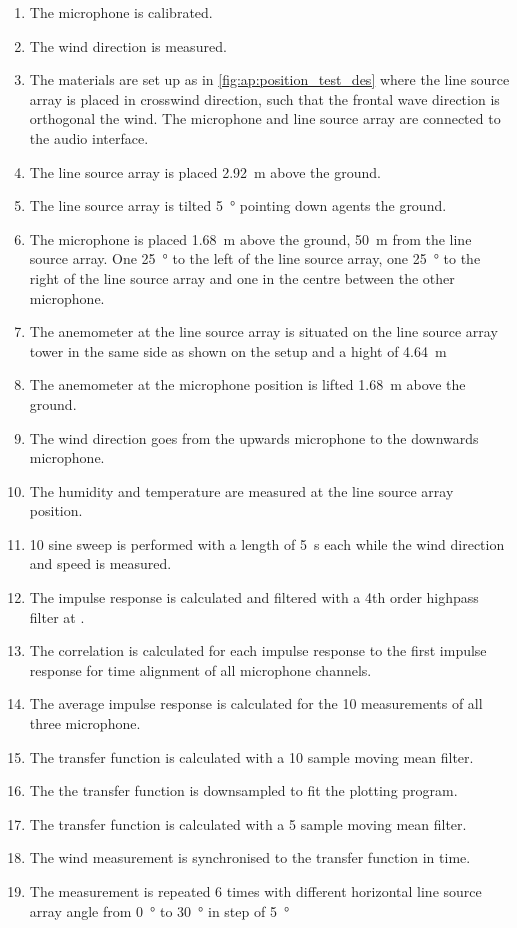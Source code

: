 \begin{enumerate}
\item The microphone is calibrated.
\item The wind direction is measured.
\item The materials are set up as in \autoref{fig:ap:position_test_des} where the line source array is placed in crosswind direction, such that the frontal wave direction is orthogonal the wind. The microphone and line source array are connected to the audio interface.
\item The line source array is placed \SI{2.92}{\meter} above the ground.
\item The line source array is tilted \SI{5}{\degree} pointing down agents the ground.
\item The microphone is placed \SI{1.68}{\meter} above the ground, \SI{50}{\meter} from the line source array. One \SI{25}{\degree} to the left of the line source array, one \SI{25}{\degree} to the right of the line source array and one in the centre between the other microphone.
\item The anemometer at the line source array is situated on the line source array tower in the same side as shown on the setup and a hight of \SI{4.64}{\meter}
\item The anemometer at the microphone position is lifted \SI{1.68}{\meter} above the ground.
\item The wind direction goes from the upwards microphone to the downwards microphone.
\item The humidity and temperature are measured at the line source array position.
\item 10 sine sweep is performed with a length of \SI{5}{\second} each while the wind direction and speed is measured.
\item The impulse response is calculated and filtered with a 4th order highpass filter at .
\item The correlation is calculated for each impulse response to the first impulse response for time alignment \citep{gunness2001loudspeaker} of all microphone channels.
\item The average impulse response is calculated for the 10 measurements of all three microphone.
\item The transfer function is calculated with a 10 sample moving mean filter.
\item The the transfer function is downsampled to fit the plotting program.
\item The transfer function is calculated with a 5 sample moving mean filter.
\item The wind measurement is synchronised to the transfer function in time. 
\item The measurement is repeated 6 times with different horizontal line source array angle from \SI{0}{\degree} to \SI{30}{\degree} in step of \SI{5}{\degree}
\end{enumerate}


